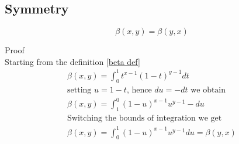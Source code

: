 \documentclass[a4paper]{article}
\begin{document}
\subsection{Symmetry}
\begin{theorem}
\begin{equation}
\beta(x, y) = \beta(y, x)
\end{equation}

Proof
\\
Starting from the definition \ref{beta def}
\begin{gather*}
\beta(x, y) = \int_{0}^{1} t^{x-1} (1-t)^{y-1} dt
\\
\text{setting $u = 1-t$, hence $du = -dt$ we obtain}
\\
\beta(x, y) = \int_{1}^{0} (1-u)^{x-1} {u}^{y-1} -du
\\
\text{Switching the bounds of integration we get}
\\
\beta(x, y) = \int_{0}^{1} (1-u)^{x-1} {u}^{y-1} du = \beta(y, x)
\end{gather*}
\end{theorem}
\end{document}
